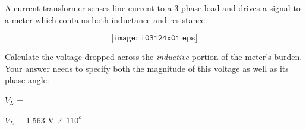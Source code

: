 

A current transformer senses line current to a 3-phase load and drives a signal to a meter which contains both inductance and resistance:

$$\texttt{[image: i03124x01.eps]}$$

Calculate the voltage dropped across the {\it inductive} portion of the meter's burden.  Your answer needs to specify both the magnitude of this voltage as well as its phase angle:

\vskip 10pt

$V_L$ = \underbar{\hskip 80pt} 







$V_L$ = 1.563 V $\angle$ $110^o$ 
 









